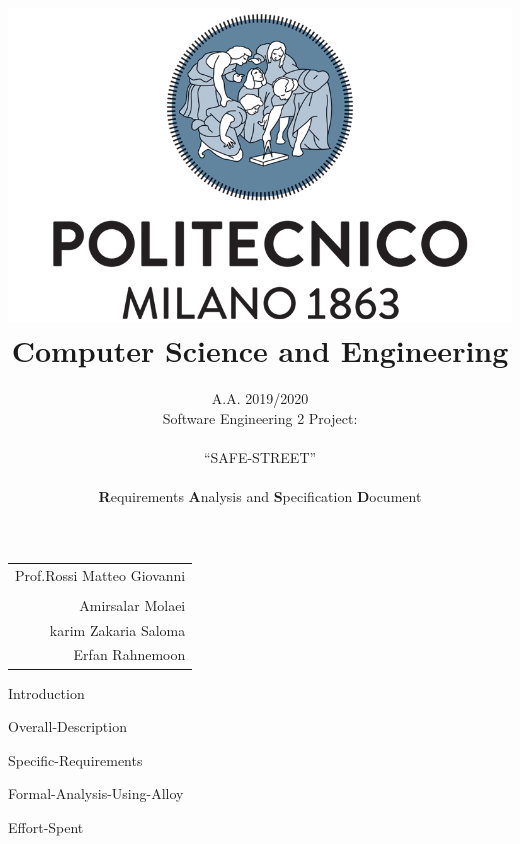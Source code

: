 \documentclass[english]{article}
\newcommand{\forcerighttext}[1]{
\vspace{0.1\textheight}
\par {\raggedleft \begin{tabular}{r}\ignorespaces
#1
\end{tabular}
\hspace{8em}
\vspace{0em}
\par}
}
\begin{document}
\begin{doublespace}

\title{\includegraphics[scale=0.4]{images/polimi}\\Computer Science and Engineering}

\author{A.A. 2019/2020\\
Software Engineering 2 Project: \\
\\
{\LARGE{}``SAFE-STREET''}\textbf{}\\
\\
\textbf{R}equirements \textbf{A}nalysis and \textbf{S}pecification
\textbf{D}ocument\\
}
\end{doublespace}

\maketitle
\thispagestyle{empty}
\forcerighttext{Prof.Rossi Matteo Giovanni\\
\\Amirsalar Molaei
\\karim Zakaria Saloma
\\Erfan Rahnemoon}


\newpage{}

\tableofcontents{}

\newpage

\listoffigures

\newpage

\listoftables

\clearpage{}

{Introduction}

\clearpage{}

{Overall-Description}


{Specific-Requirements}

\clearpage{}

{Formal-Analysis-Using-Alloy}

\clearpage{}

{Effort-Spent}
\end{document}

